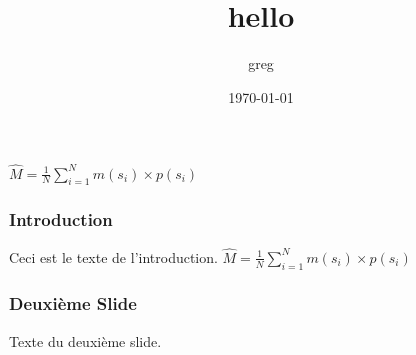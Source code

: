 \documentclass{beamer}
\begin{document}
\title{hello}
\author{greg}
\date{\today}

\begin{frame}
  \titlepage

  $\hat{M}= \frac{1}{N} \sum_{i=1}^{N} m(s_i) \times p(s_i)$

\end{frame}

\begin{frame}
  \frametitle{Introduction}
  Ceci est le texte de l'introduction.
  $\hat{M}= \frac{1}{N} \sum_{i=1}^{N} m(s_i) \times p(s_i)$

\end{frame}

\begin{frame}
  \frametitle{Deuxième Slide}
  Texte du deuxième slide.
\end{frame}
\end{document}
